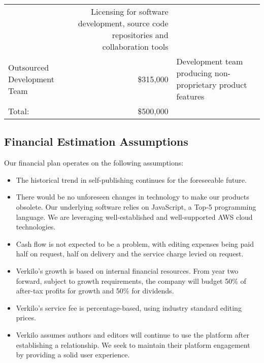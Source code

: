 \documentclass[10pt,openany]{book}
\begin{document}
\begin{longtable}[]{@{}lrl@{}}
\begin{minipage}[t]{0.11\columnwidth}
\end{minipage} & \begin{minipage}[t]{0.39\columnwidth}\raggedright
Licensing for software development, source code repositories and
collaboration tools\strut
\end{minipage}\tabularnewline
\begin{minipage}[t]{0.41\columnwidth}\raggedright
Outsourced Development Team\strut
\end{minipage} & \begin{minipage}[t]{0.11\columnwidth}\raggedleft
\$315,000\strut
\end{minipage} & \begin{minipage}[t]{0.39\columnwidth}\raggedright
Development team producing non-proprietary product features\strut
\end{minipage}\tabularnewline
\begin{minipage}[t]{0.41\columnwidth}\raggedright
Total:\strut
\end{minipage} & \begin{minipage}[t]{0.11\columnwidth}\raggedleft
\$500,000\strut
\end{minipage} & \begin{minipage}[t]{0.39\columnwidth}\raggedright
\strut
\end{minipage}\tabularnewline
\bottomrule
\end{longtable}

\hypertarget{financial-estimation-assumptions}{%
\subsection{Financial Estimation
Assumptions}\label{financial-estimation-assumptions}}

Our financial plan operates on the following assumptions:

\begin{itemize}
\item
  The historical trend in self-publishing continues for the foreseeable
  future.
\item
  There would be no unforeseen changes in technology to make our
  products obsolete. Our underlying software relies on JavaScript, a
  Top-5 programming language. We are leveraging well-established and
  well-supported AWS cloud technologies.
\item
  Cash flow is not expected to be a problem, with editing expenses being
  paid half on request, half on delivery and the service charge levied
  on request.
\item
  Verkilo's growth is based on internal financial resources. From year
  two forward, subject to growth requirements, the company will budget
  50\% of after-tax profits for growth and 50\% for dividends.
\item
  Verkilo's service fee is percentage-based, using industry standard
  editing prices.
\item
  Verkilo assumes authors and editors will continue to use the platform
  after establishing a relationship. We seek to maintain their platform
  engagement by providing a solid user experience.
\end{itemize}
\end{document}
